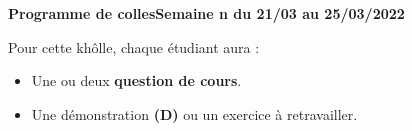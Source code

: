 \documentclass[twoside,a4paper,french,10pt]{VcCours}
\begin{document}

\begin{center}
\large\bf
Programme de collesSemaine n du 21/03 au 25/03/2022
\end{center}
\separationTitre

\vspace*{-1em}
Pour cette khôlle, chaque étudiant aura :
\begin{itemize}
\item Une ou deux \textbf{question de cours}.
\item Une démonstration \textbf{(D)} ou un exercice à retravailler.
\end{itemize} 
  

\vspace*{-1em}
\end{document}
